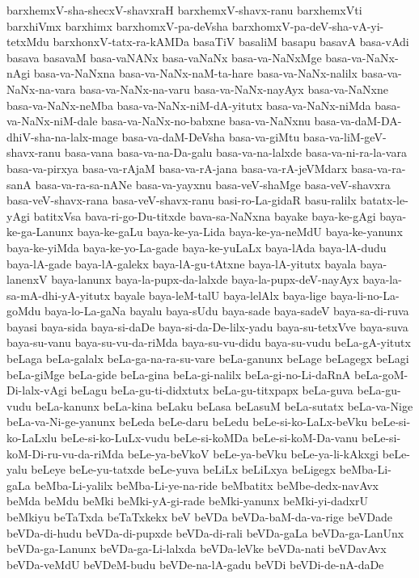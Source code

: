 {barxhemxV-sha-shecxV-shavxraH
barxhemxV-shavx-ranu
barxhemxVti
barxhiVmx
barxhimx
barxhomxV-pa-deVsha
barxhomxV-pa-deV-sha-vA-yi-tetxMdu
barxhonxV-tatx-ra-kAMDa
basaTiV
basaliM
basapu
basavA
basa-vAdi
basava
basavaM
basa-vaNANx
basa-vaNaNx
basa-va-NaNxMge
basa-va-NaNx-nAgi
basa-va-NaNxna
basa-va-NaNx-naM-ta-hare
basa-va-NaNx-nalilx
basa-va-NaNx-na-vara
basa-va-NaNx-na-varu
basa-va-NaNx-nayAyx
basa-va-NaNxne
basa-va-NaNx-neMba
basa-va-NaNx-niM-dA-yitutx
basa-va-NaNx-niMda
basa-va-NaNx-niM-dale
basa-va-NaNx-no-babxne
basa-va-NaNxnu
basa-va-daM-DA-dhiV-sha-na-lalx-mage
basa-va-daM-DeVsha
basa-va-giMtu
basa-va-liM-geV-shavx-ranu
basa-vana
basa-va-na-Da-galu
basa-va-na-lalxde
basa-va-ni-ra-la-vara
basa-va-pirxya
basa-va-rAjaM
basa-va-rA-jana
basa-va-rA-jeVMdarx
basa-va-ra-sanA
basa-va-ra-sa-nANe
basa-va-yayxnu
basa-veV-shaMge
basa-veV-shavxra
basa-veV-shavx-rana
basa-veV-shavx-ranu
basi-ro-La-gidaR
basu-ralilx
batatx-le-yAgi
batitxVsa
bava-ri-go-Du-titxde
bava-sa-NaNxna
bayake
baya-ke-gAgi
baya-ke-ga-Lanunx
baya-ke-gaLu
baya-ke-ya-Lida
baya-ke-ya-neMdU
baya-ke-yanunx
baya-ke-yiMda
baya-ke-yo-La-gade
baya-ke-yuLaLx
baya-lAda
baya-lA-dudu
baya-lA-gade
baya-lA-galekx
baya-lA-gu-tAtxne
baya-lA-yitutx
bayala
baya-lanenxV
baya-lanunx
baya-la-pupx-da-lalxde
baya-la-pupx-deV-nayAyx
baya-la-sa-mA-dhi-yA-yitutx
bayale
baya-leM-talU
baya-lelAlx
baya-lige
baya-li-no-La-goMdu
baya-lo-La-gaNa
bayalu
baya-sUdu
baya-sade
baya-sadeV
baya-sa-di-ruva
bayasi
baya-sida
baya-si-daDe
baya-si-da-De-lilx-yadu
baya-su-tetxVve
baya-suva
baya-su-vanu
baya-su-vu-da-riMda
baya-su-vu-didu
baya-su-vudu
beLa-gA-yitutx
beLaga
beLa-galalx
beLa-ga-na-ra-su-vare
beLa-ganunx
beLage
beLagegx
beLagi
beLa-giMge
beLa-gide
beLa-gina
beLa-gi-nalilx
beLa-gi-no-Li-daRnA
beLa-goM-Di-lalx-vAgi
beLagu
beLa-gu-ti-didxtutx
beLa-gu-titxpapx
beLa-guva
beLa-gu-vudu
beLa-kanunx
beLa-kina
beLaku
beLasa
beLasuM
beLa-sutatx
beLa-va-Nige
beLa-va-Ni-ge-yanunx
beLeda
beLe-daru
beLedu
beLe-si-ko-LaLx-beVku
beLe-si-ko-LaLxlu
beLe-si-ko-LuLx-vudu
beLe-si-koMDa
beLe-si-koM-Da-vanu
beLe-si-koM-Di-ru-vu-da-riMda
beLe-ya-beVkoV
beLe-ya-beVku
beLe-ya-li-kAkxgi
beLe-yalu
beLeye
beLe-yu-tatxde
beLe-yuva
beLiLx
beLiLxya
beLigegx
beMba-Li-gaLa
beMba-Li-yalilx
beMba-Li-ye-na-ride
beMbatitx
beMbe-dedx-navAvx
beMda
beMdu
beMki
beMki-yA-gi-rade
beMki-yanunx
beMki-yi-dadxrU
beMkiyu
beTaTxda
beTaTxkekx
beV
beVDa
beVDa-baM-da-va-rige
beVDade
beVDa-di-hudu
beVDa-di-pupxde
beVDa-di-rali
beVDa-gaLa
beVDa-ga-LanUnx
beVDa-ga-Lanunx
beVDa-ga-Li-lalxda
beVDa-leVke
beVDa-nati
beVDavAvx
beVDa-veMdU
beVDeM-budu
beVDe-na-lA-gadu
beVDi
beVDi-de-nA-daDe
}
